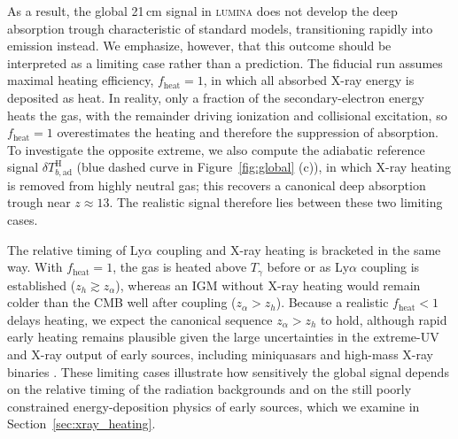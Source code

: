 \documentclass[apj,twocolumn, appendixfloats, twocolappendix, numberedappendix, tighten]{openjournal}
\DeclareRobustCommand{\lumina}{\mbox{\textsc{lumina}}\xspace}
\begin{document}
As a result, the global 21\,cm signal in \lumina does not develop the deep absorption trough characteristic of standard models, transitioning rapidly into emission instead. We emphasize, however, that this outcome should be interpreted as a limiting case rather than a prediction. The fiducial run assumes maximal heating efficiency, $f_\mathrm{heat}=1$, in which all absorbed X-ray energy is deposited as heat. In reality, only a fraction of the secondary-electron energy heats the gas, with the remainder driving ionization and collisional excitation, so $f_\mathrm{heat}=1$ overestimates the heating and therefore the suppression of absorption. To investigate the opposite extreme, we also compute the adiabatic reference signal $\delta T_{b,\mathrm{ad}}^\mathrm{H}$ (blue dashed curve in Figure~\ref{fig:global} (c)), in which X-ray heating is removed from highly neutral gas; this recovers a canonical deep absorption trough near $z \approx 13$. The realistic signal therefore lies between these two limiting cases.



The relative timing of Ly$\alpha$ coupling and X-ray heating is bracketed in the same way. With $f_\mathrm{heat}=1$, the gas is heated above $T_\gamma$ before or as Ly$\alpha$ coupling is established ($z_h \gtrsim z_\alpha$), whereas an IGM without X-ray heating would remain colder than the CMB well after coupling ($z_\alpha > z_h$). Because a realistic $f_\mathrm{heat} < 1$ delays heating, we expect the canonical sequence $z_\alpha > z_h$ to hold, although rapid early heating remains plausible given the large uncertainties in the extreme-UV and X-ray output of early sources, including miniquasars and high-mass X-ray binaries \citep{Nusser2005}. These limiting cases illustrate how sensitively the global signal depends on the relative timing of the radiation backgrounds and on the still poorly constrained energy-deposition physics of early sources, which we examine in Section~\ref{sec:xray_heating}.

%
\end{document}
